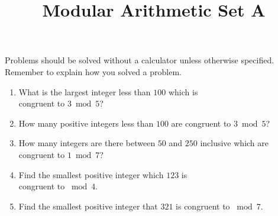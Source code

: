 \documentclass{article}
\title{Modular Arithmetic Set A}
\author{}
\date{}
\begin{document}
\maketitle
\noindent Problems should be solved without a calculator unless otherwise specified.
Remember to explain how you solved a problem.
\begin{multicols}{2}
    \begin{enumerate}
        \item What is the largest integer less than $100$ which is \\ congruent to $3\bmod 5$?
        \vspace{3cm}
        \item How many positive integers less than $100$ are congruent to $3\bmod 5$?
        \vspace{3cm}
        \item How many integers are there between $50$ and $250$ inclusive which are congruent to $1\bmod 7$?
        \vspace{3cm}
        \columnbreak
        \item Find the smallest positive integer which $123$ is \\ congruent to $\bmod 4$.
        \vspace{3cm}
        \item Find the smallest positive integer that $321$ is congruent to $\bmod 7$.
        \vspace{3cm}
    \end{enumerate}
\end{multicols}
\end{document}
